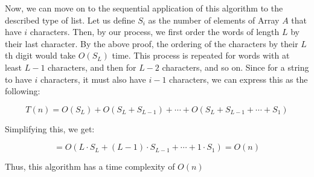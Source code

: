 \documentclass[11pt]{article}
\begin{document}
Now, we can move on to the sequential application of this algorithm to the described type of list. 
Let us define $S_i$ as the number of elements of Array $A$ that have $i$ characters. 
Then, by our process, we first order the words of length $L$ by their last character. 
By the above proof, the ordering of the characters by their $L$th digit would take $O(S_L)$ time. 
This process is repeated for words with at least $L-1$ characters, and then for $L-2$ characters, and so on. 
Since for a string to have $i$ characters, it must also have $i-1$ characters, we can express this as the following:

$$T(n)=O(S_L)+O(S_L+S_{L-1})+\cdots+O(S_L+S_{L-1}+\cdots+S_1)$$

Simplifying this, we get: 

$$=O(L\cdot S_L+(L-1)\cdot S_{L-1}+\cdots+1\cdot S_1)=O(n)$$

Thus, this algorithm has a time complexity of $O(n)$
\end{document}
